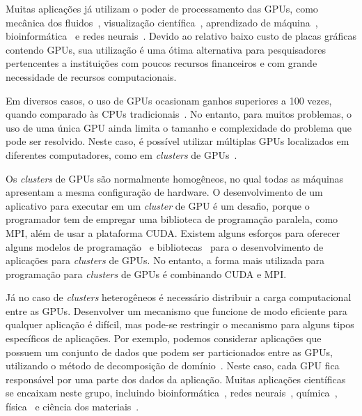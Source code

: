 Muitas aplicações já utilizam o poder de processamento das GPUs, como mecânica
dos fluidos~\citep{fluido}, visualização científica~\citep{visualizacao},
aprendizado de máquina~\citep{Aprendizado}, bioinformática~\citep{rozante} e redes
neurais~\citep{siang}. Devido ao relativo baixo custo de placas gráficas contendo
GPUs, sua utilização é uma ótima alternativa para pesquisadores pertencentes a
instituições com poucos recursos financeiros e com grande necessidade de
recursos computacionais.

Em diversos casos, o uso de GPUs ocasionam ganhos superiores a 100 vezes, quando
comparado às CPUs tradicionais~\citep{Vouzis15012011}. No entanto, para muitos problemas, o uso de uma
única GPU ainda limita o tamanho e complexidade do problema que pode ser
resolvido. Neste caso, é possível utilizar múltiplas GPUs localizados em
diferentes computadores, como em \emph{clusters} de GPUs~\citep{raphael,
  cluster}.

Os \emph{clusters} de GPUs são normalmente homogêneos, no qual todas as
máquinas apresentam a mesma configuração de hardware. O desenvolvimento de um
aplicativo para executar em um \emph{cluster} de GPU é um desafio, porque o
programador tem de empregar uma biblioteca de programação paralela, como MPI,
além de usar a plataforma CUDA. Existem alguns esforços para oferecer alguns
modelos de programação~\citep{appCientificas, wave} e bibliotecas~\citep{snucl,
  Flat} para o desenvolvimento de aplicações para \emph{clusters} de GPUs. No
entanto, a forma mais utilizada para programação para \emph{clusters} de GPUs
é combinando CUDA e MPI.

Já no caso de \emph{clusters} heterogêneos é necessário distribuir a carga
computacional entre as GPUs. Desenvolver um mecanismo que funcione de modo
eficiente para qualquer aplicação é difícil, mas pode-se restringir o mecanismo
para alguns tipos específicos de aplicações. Por exemplo, podemos considerar
aplicações que possuem um conjunto de dados que podem ser particionados entre as
GPUs, utilizando o método de decomposição de domínio~\citep{CNM:CNM1640090307}. Neste caso, cada GPU fica
responsável por uma parte dos dados da aplicação. Muitas aplicações científicas
se encaixam neste grupo, incluindo bioinformática~\citep{rozante}, redes
neurais~\citep{siang}, química~\citep{anastas2000green}, física~\citep{delpech2009reactor} e ciência dos materiais~\citep{da2007desenvolvimento}. 

